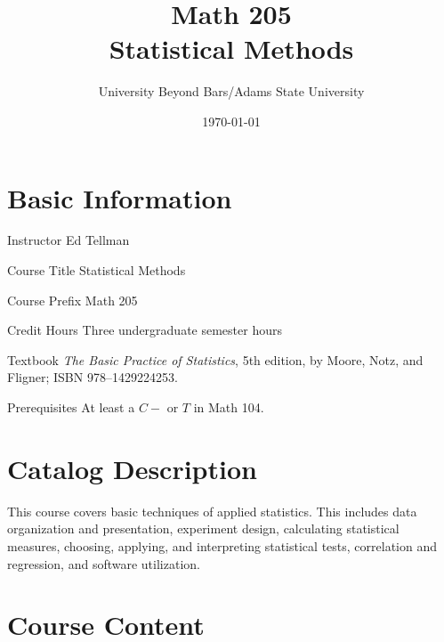 \documentclass[letterpaper, landscape]{article}
\title{Math 205 \\ Statistical Methods}
\author{University Beyond Bars/Adams State University}
\date{\today}
\begin{document}
  \maketitle



  \section{Basic Information} %
 
  \begin{description*}
    \item[Instructor] Ed Tellman 
    \item[Course Title] Statistical Methods
    \item[Course Prefix] Math 205
    \item[Credit Hours] Three undergraduate semester hours 
    \item[Textbook] {\em The Basic Practice of Statistics}, 5th edition, by
      Moore, Notz, and Fligner;  ISBN 978--1429224253.
    \item[Prerequisites] At least a $C-$ or $T$ in Math 104.
  \end{description*}

  \section{Catalog Description}
  This course covers basic techniques of applied statistics. This includes data
  organization and presentation, experiment design, calculating statistical
  measures, choosing, applying, and interpreting statistical tests, correlation
  and regression, and software utilization.


  \section{Course Content} 
\end{document}
